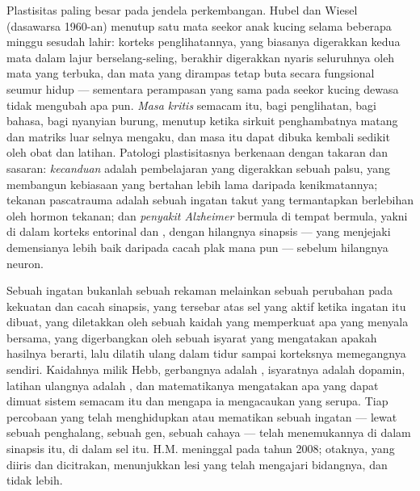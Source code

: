 \begin{definition}\label{def:b3:learning-memory:critical}
Plastisitas paling besar pada jendela perkembangan. Hubel dan Wiesel
(dasawarsa 1960-an) menutup satu mata seekor anak kucing selama beberapa minggu sesudah lahir:
korteks penglihatannya, yang biasanya digerakkan kedua mata dalam lajur berselang-seling,
berakhir digerakkan nyaris seluruhnya oleh mata yang terbuka, dan mata yang dirampas
tetap buta secara fungsional seumur hidup --- sementara perampasan yang sama pada seekor
kucing dewasa tidak mengubah apa pun. \emph{Masa kritis} semacam itu, bagi penglihatan,
bagi bahasa, bagi nyanyian burung, menutup ketika sirkuit penghambatnya
matang dan matriks luar selnya mengaku, dan masa itu dapat dibuka kembali
sedikit oleh obat dan latihan. Patologi plastisitasnya berkenaan dengan takaran
dan sasaran: \emph{kecanduan} adalah pembelajaran yang digerakkan sebuah
 palsu, yang membangun kebiasaan yang bertahan lebih lama daripada kenikmatannya;
tekanan pascatrauma adalah sebuah ingatan takut yang termantapkan berlebihan oleh hormon
tekanan; dan \emph{penyakit Alzheimer} bermula di tempat 
bermula, yakni di dalam korteks entorinal dan , dengan hilangnya
sinapsis --- yang menjejaki demensianya lebih baik daripada cacah plak mana pun ---
sebelum hilangnya neuron.
\end{definition}

\begin{remark}\label{rem:b3:learning-memory:what}
Sebuah ingatan bukanlah sebuah rekaman melainkan sebuah perubahan pada kekuatan dan cacah
sinapsis, yang tersebar atas sel yang aktif ketika ingatan itu
dibuat, yang diletakkan oleh sebuah kaidah yang memperkuat apa yang menyala bersama, yang digerbangkan
oleh sebuah isyarat yang mengatakan apakah hasilnya berarti, lalu dilatih ulang dalam
tidur sampai korteksnya memegangnya sendiri. Kaidahnya milik Hebb,
gerbangnya adalah , isyaratnya adalah dopamin, latihan ulangnya adalah
, dan matematikanya mengatakan apa yang dapat dimuat sistem semacam itu dan mengapa
ia mengacaukan yang serupa. Tiap percobaan yang telah menghidupkan atau mematikan sebuah ingatan
--- lewat sebuah penghalang, sebuah gen, sebuah cahaya --- telah menemukannya di dalam
sinapsis itu, di dalam sel itu. H.M. meninggal pada tahun 2008; otaknya, yang diiris dan
dicitrakan, menunjukkan lesi yang telah mengajari bidangnya, dan tidak lebih.
\end{remark}


